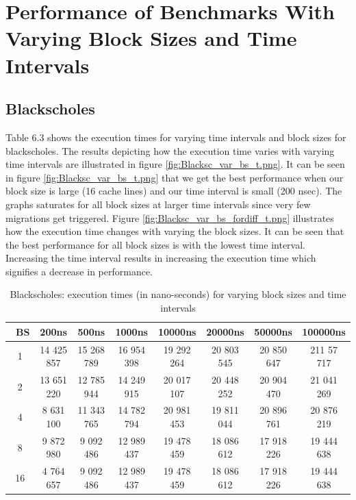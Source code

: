\documentclass{listhesis}
\begin{document}
\section{Performance of Benchmarks With Varying Block Sizes and Time Intervals}
\subsection{Blackscholes}
Table 6.3 shows the execution times for varying time intervals and block sizes for blackscholes. The results depicting how the execution time varies with varying time intervals are illustrated in figure \ref{fig:Blacksc_var_bs_t.png}. It can be seen in figure \ref{fig:Blacksc_var_bs_t.png} that we get the best performance when our block size is large (16 cache lines) and our time interval is small (200 nsec). The graphs saturates for all block sizes at larger time intervals since very few migrations get triggered.
Figure \ref{fig:Blacksc_var_bs_fordiff_t.png} illustrates how the execution time changes with varying the block sizes. It can be seen that the best performance for all block sizes is with the lowest time interval. Increasing the time interval results in increasing the execution time which signifies a decrease in performance. 

\begin{table}[h!]
\begin{center}
 \begin{tabular}{|| c | c | c | c| c | c | c | c||} 
 \hline
 \ \textbf{BS} & \textbf{200ns}  & \textbf{500ns}  & \textbf{1000ns} & \textbf{10000ns} & \textbf{20000ns} & \textbf{50000ns} & \textbf{100000ns}\\ [0.5 ex] 
 \hline\hline
   1 & 14 425 857  & 15 268 789 &  16 954 398 & 19 292 264 & 20 803 545 & 20 850 647 &  211 57 717\\ 
 \hline
   2 & 13 651 220 & 12 785 944 & 14 249 915 & 20 017 107 & 20 448 252 & 20 904 470 & 21 041 269\\
 \hline
   4 & 8 631 100 & 11 343 765 & 14 782 794 & 20 981 453 & 19 811 044 & 20 896 761 & 20 876 219\\
 \hline
   8 & 9 872 980 & 9 092 486 & 12 989 437 & 19 478 459 & 18 086 612 & 17 918 226 & 19 444 638\\
  \hline
   16 & 4 764 657 & 9 092 486 & 12 989 437 & 19 478 459 & 18 086 612 & 17 918 226 & 19 444 638\\
    \hline
\end{tabular}
 \caption{Blackscholes: execution times (in nano-seconds) for varying block sizes and time intervals}
 \label{table:ExecTimes2}
\end{center}
\end{table}
\end{document}
